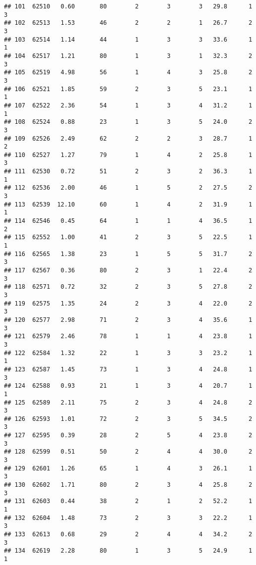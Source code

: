 \documentclass[
]{article}
\begin{document}
\begin{verbatim}
## 101  62510   0.60       80        2        3        3   29.8      1      3
## 102  62513   1.53       46        2        2        1   26.7      2      3
## 103  62514   1.14       44        1        3        3   33.6      1      1
## 104  62517   1.21       80        1        3        1   32.3      2      3
## 105  62519   4.98       56        1        4        3   25.8      2      3
## 106  62521   1.85       59        2        3        5   23.1      1      1
## 107  62522   2.36       54        1        3        4   31.2      1      1
## 108  62524   0.88       23        1        3        5   24.0      2      3
## 109  62526   2.49       62        2        2        3   28.7      1      2
## 110  62527   1.27       79        1        4        2   25.8      1      3
## 111  62530   0.72       51        2        3        2   36.3      1      1
## 112  62536   2.00       46        1        5        2   27.5      2      3
## 113  62539  12.10       60        1        4        2   31.9      1      1
## 114  62546   0.45       64        1        1        4   36.5      1      2
## 115  62552   1.00       41        2        3        5   22.5      1      1
## 116  62565   1.38       23        1        5        5   31.7      2      3
## 117  62567   0.36       80        2        3        1   22.4      2      3
## 118  62571   0.72       32        2        3        5   27.8      2      3
## 119  62575   1.35       24        2        3        4   22.0      2      3
## 120  62577   2.98       71        2        3        4   35.6      1      3
## 121  62579   2.46       78        1        1        4   23.8      1      3
## 122  62584   1.32       22        1        3        3   23.2      1      1
## 123  62587   1.45       73        1        3        4   24.8      1      3
## 124  62588   0.93       21        1        3        4   20.7      1      1
## 125  62589   2.11       75        2        3        4   24.8      2      3
## 126  62593   1.01       72        2        3        5   34.5      2      3
## 127  62595   0.39       28        2        5        4   23.8      2      3
## 128  62599   0.51       50        2        4        4   30.0      2      3
## 129  62601   1.26       65        1        4        3   26.1      1      3
## 130  62602   1.71       80        2        3        4   25.8      2      3
## 131  62603   0.44       38        2        1        2   52.2      1      1
## 132  62604   1.48       73        2        3        3   22.2      1      3
## 133  62613   0.68       29        2        4        4   34.2      2      3
## 134  62619   2.28       80        1        3        5   24.9      1      1

\end{verbatim}
\end{document}
